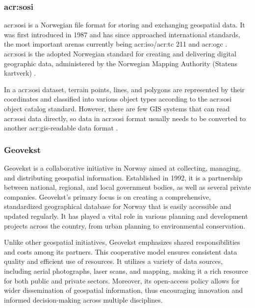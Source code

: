\subsubsection[SOSI]{\acrshort{acr:sosi}}\label{subsubsec:sosi}

\gls{acr:sosi} is a Norwegian file format for storing and exchanging geospatial data. It was first introduced in 1987 and has since approached international standards, the most important arenas currently being \acrshort{acr:iso}/\acrshort{acr:tc} 211 and \gls{acr:ogc} \citep{mardalNasjonalStrategiVidereutvikling2015}. \gls{acr:sosi} is the adopted Norwegian standard for creating and delivering digital geographic data, administered by the Norwegian Mapping Authority (Statens kartverk) \citep{maehlumSOSI2023}.

In a \gls{acr:sosi} dataset, terrain points, lines, and polygons are represented by their coordinates and classified into various object types according to the \gls{acr:sosi} object catalog standard. However, there are few GIS systems that can read \gls{acr:sosi} data directly, so data in \gls{acr:sosi} format usually needs to be converted to another \gls{acr:gis}-readable data format \citep{maehlumSOSI2023}.

\subsubsection{Geovekst}\label{subsubsec:geovekst}

Geovekst is a collaborative initiative in Norway aimed at collecting, managing, and distributing geospatial information. Established in 1992, it is a partnership between national, regional, and local government bodies, as well as several private companies. Geovekst's primary focus is on creating a comprehensive, standardized geographical database for Norway that is easily accessible and updated regularly. It has played a vital role in various planning and development projects across the country, from urban planning to environmental conservation.

Unlike other geospatial initiatives, Geovekst emphasizes shared responsibilities and costs among its partners. This cooperative model ensures consistent data quality and efficient use of resources. It utilizes a variety of data sources, including aerial photographs, laser scans, and mapping, making it a rich resource for both public and private sectors. Moreover, its open-access policy allows for wider dissemination of geospatial information, thus encouraging innovation and informed decision-making across multiple disciplines.

